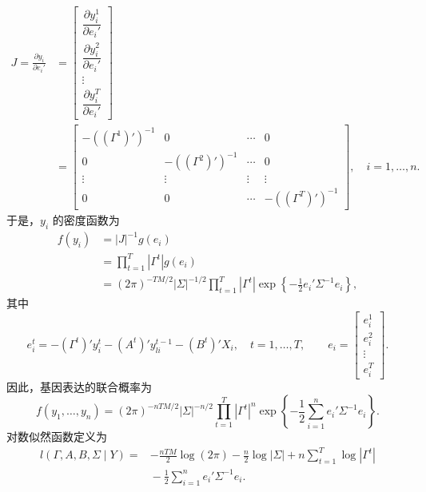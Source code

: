 \begin{equation}
\begin{aligned}
J=\frac{\partial y_i}{\partial e_i'}
&=\begin{bmatrix}
\dfrac{\partial y_i^1}{\partial e_i'}\\
\dfrac{\partial y_i^2}{\partial e_i'}\\\vdots\\
\dfrac{\partial y_i^T}{\partial e_i'}
\end{bmatrix}\\
&=\begin{bmatrix}
-((\Gamma^1)')^{-1}&0&\cdots&0\\
0&-((\Gamma^2)')^{-1}&\cdots&0\\
\vdots&\vdots&\vdots&\vdots\\
0&0&\cdots&-((\Gamma^T)')^{-1}
\end{bmatrix},\quad i=1,\ldots,n.
\end{aligned}\tag{4.E.9}
\end{equation}
于是，$y_i$ 的密度函数为
\begin{equation}
\begin{aligned}
f(y_i)&=|J|^{-1}g(e_i)\\
&=\prod_{t=1}^{T}|\Gamma^t|g(e_i)\\
&=(2\pi)^{-TM/2}|\Sigma|^{-1/2}\prod_{t=1}^{T}|\Gamma^t|
\exp\left\{-\frac12e_i'\Sigma^{-1}e_i\right\},
\end{aligned}\tag{4.E.10}
\end{equation}
其中
\[
e_i^t=-(\Gamma^t)'y_i^t-(A^t)'y_{li}^{t-1}-(B^t)'X_i,
\quad t=1,\ldots,T,\qquad
e_i=\begin{bmatrix}e_i^1\\e_i^2\\\vdots\\e_i^T\end{bmatrix}.
\]
因此，基因表达的联合概率为
\begin{equation}
f(y_1,\ldots,y_n)=(2\pi)^{-nTM/2}|\Sigma|^{-n/2}
\prod_{t=1}^{T}|\Gamma^t|^n
\exp\left\{-\frac12\sum_{i=1}^{n}e_i'\Sigma^{-1}e_i\right\}.\tag{4.E.11}
\end{equation}
对数似然函数定义为
\begin{equation}
\begin{aligned}
l(\Gamma,A,B,\Sigma\mid Y)
={}&-\frac{nTM}{2}\log(2\pi)-\frac n2\log|\Sigma|
+n\sum_{t=1}^{T}\log|\Gamma^t|\\
&{}-\frac12\sum_{i=1}^{n}e_i'\Sigma^{-1}e_i.
\end{aligned}\tag{4.E.12}
\end{equation}

